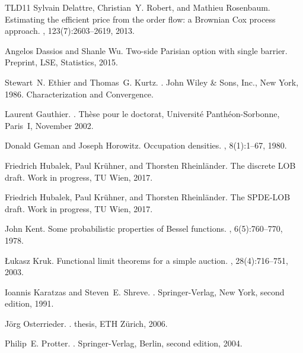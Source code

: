 \documentclass[11pt]{scrartcl}
\begin{document}
\begin{thebibliography}{TLD{\etalchar{+}}11}
Sylvain Delattre, Christian~Y. Robert, and Mathieu Rosenbaum.
\newblock Estimating the efficient price from the order flow: a {B}rownian
  {C}ox process approach.
, 123(7):2603--2619,
  2013.

Angelos Dassios and Shanle Wu.
\newblock Two-side {Parisian} option with single barrier.
\newblock Preprint, LSE, Statistics, 2015.

Stewart~N. Ethier and Thomas~G. Kurtz.
.
\newblock John Wiley \& Sons, Inc., New York, 1986.
\newblock Characterization and Convergence.

Laurent Gauthier.
.
\newblock Th{\`e}se pour le doctorat, Universit{\'e} Panth{\'e}on-Sorbonne,
  Paris~I, November 2002.

Donald Geman and Joseph Horowitz.
\newblock Occupation densities.
, 8(1):1--67, 1980.

Friedrich Hubalek, Paul Kr\"{u}hner, and Thorsten Rheinl\"{a}nder.
\newblock The discrete {LOB} draft.
\newblock Work in progress, {TU Wien}, 2017.

Friedrich Hubalek, Paul Kr\"{u}hner, and Thorsten Rheinl\"{a}nder.
\newblock The {SPDE}-{LOB} draft.
\newblock Work in progress, {TU Wien}, 2017.

John Kent.
\newblock Some probabilistic properties of {B}essel functions.
, 6(5):760--770, 1978.

{\L}ukasz Kruk.
\newblock Functional limit theorems for a simple auction.
, 28(4):716--751, 2003.

Ioannis Karatzas and Steven~E. Shreve.
.
\newblock Springer-Verlag, New York, second edition, 1991.

J{\"o}rg Osterrieder.
.
 thesis, ETH Z\"urich, 2006.

Philip~E. Protter.
.
\newblock Springer-Verlag, Berlin, second edition, 2004.


\end{thebibliography}
\end{document}

